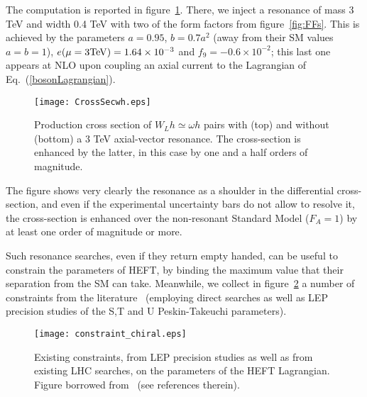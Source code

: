\documentclass{PoS}
\begin{document}
\noindent The computation is reported in figure~\ref{fig:Xsecwh}.
There, we inject a resonance of mass 3 TeV and width 0.4 TeV with two of the form factors from figure~\ref{fig:FFs}. This is achieved by the parameters $a=0.95$, $b=0.7a^2$ (away from their SM values $a=b=1$), $e(\mu=3{\rm TeV})=1.64\times 10^{-3}$ and $f_9=-0.6\times 10^{-2}$; this last one appears at NLO upon coupling an axial current to the Lagrangian of Eq.~(\ref{bosonLagrangian}).
\begin{figure}
\centering
\texttt{[image: CrossSecwh.eps]}
\caption{\label{fig:Xsecwh} {\small Production cross section of $W_L h\simeq \omega h$ pairs with (top) and without (bottom) a 3 TeV axial-vector resonance. The cross-section is enhanced by the latter, in this case by one and a half orders of magnitude.}}
\end{figure}

The figure shows very clearly the resonance as a shoulder in the differential cross-section, and even if the experimental uncertainty bars do not allow to resolve it, the cross-section is enhanced over the non-resonant Standard Model ($F_A=1$) by at least one order of magnitude or more.

Such resonance searches, even if they return empty handed, can be useful to constrain  the parameters of HEFT, by binding the maximum value that their separation from the SM can take.
Meanwhile, we collect in figure~\ref{fig:parameters} a number of constraints from the literature~\cite{Delgado:2017cls} (employing direct searches as well as LEP precision studies of the S,T and U Peskin-Takeuchi parameters).


\begin{figure}
\centering
\texttt{[image: constraint\_chiral.eps]}
\caption{\label{fig:parameters}    
  {\small  Existing constraints, from LEP precision studies as well as from existing LHC searches, on the parameters of the HEFT Lagrangian.  %
  Figure borrowed from~\cite{Delgado:2017cls} (see references therein).} } 
\end{figure}
\end{document}
